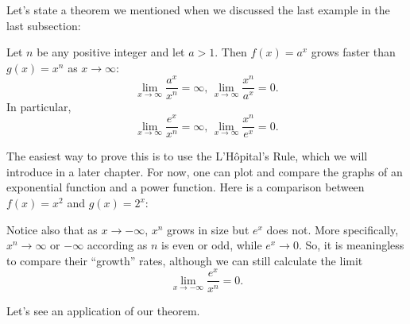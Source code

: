 Let's state a theorem we mentioned when we discussed the last example in the
last subsection:

\begin{theorem}{}{}
Let $n$ be any positive integer and let $a>1$. Then $f(x)=a^x$
grows faster than $g(x)=x^n$ as $x\to \infty$:
\begin{equation*}
\lim_{x\to \infty}\frac{a^x}{x^n}=\infty\text{, }\lim_{x\to \infty}\frac{x^n}{a^x}=0.
\end{equation*}%
In particular,%
\begin{equation*}
\lim_{x\to \infty}\frac{e^x}{x^n}=\infty\text{, }\lim_{x\to \infty}\frac{x^n}{e^x}=0.
\end{equation*}
\end{theorem}

The easiest way to prove this is to use the L'H\^{o}pital's Rule, which we will
introduce in a later chapter. For now, one can plot and compare the graphs
of an exponential function and a power function. Here is a comparison
between $f(x)=x^2$ and $g(x)=2^x$:

\begin{center}
\end{center}

Notice also that as $x\to -\infty$, $x^n$ grows in size but
$e^x$ does not. More specifically, $x^n\to \infty$ or $-\infty$
according as $n$ is even or odd, while $e^x\to 0$. So, it is
meaningless to compare their ``growth''
rates, although we can still calculate the limit
\begin{equation*}
\lim_{x\to -\infty}\frac{e^x}{x^n}=0.
\end{equation*}

Let's see an application of our theorem.

